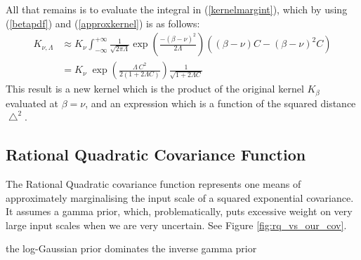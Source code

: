 \documentclass{article}
\begin{document}
All that remains is to evaluate the integral in (\ref{kernelmargint}), which by using (\ref{betapdf}) and (\ref{approxkernel}) is as follows:
\begin{align}
K_{\nu,\Lambda} &\approx K_{\nu}\int_{-\infty}^{+\infty} \frac{1}{\sqrt{2 \pi \Lambda}} \exp \left( \frac{ -(\beta - \nu)^2}{2\Lambda} \right) \left( (\beta-\nu) C - (\beta-\nu)^2 C \right) \nonumber \\
&= K_{\nu} \; \exp \left( \frac{\Lambda\, C^2}{2(1+2\Lambda C)} \right) \frac{1}{\sqrt{1+ 2\Lambda C}}
\end{align}
This result is a new kernel which is the product of the original kernel $K_\beta$ evaluated at $\beta=\nu$, and an expression which is a function of the squared distance $ \bigtriangleup^2$. 

\subsection{Rational Quadratic Covariance Function} 

The Rational Quadratic covariance function represents one means of approximately marginalising the input scale of a squared exponential covariance. It assumes a gamma prior, which, problematically, puts excessive weight on very large input scales when we are very uncertain. See Figure \ref{fig:rq_vs_our_cov}.

the log-Gaussian prior dominates the inverse gamma prior

\begin{equation}
\end{equation}
\end{document}
